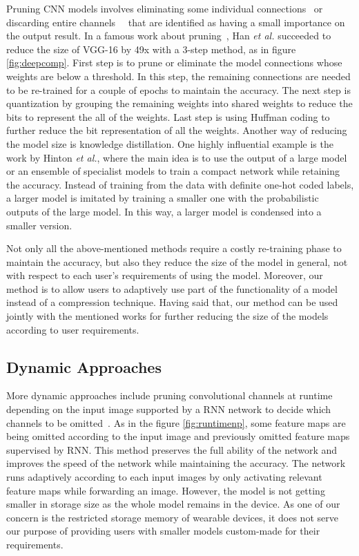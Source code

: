 Pruning CNN models involves eliminating some individual connections~\cite{molchanov2016pruning} \cite{Yu_2018_CVPR} \cite{Wang2018StructuredPP} or discarding entire channels~\cite{He_2017_ICCV}~\cite{li2016pruning} that are identified as having a small importance on the output result.
In a famous work about pruning~\cite{han2015deep}, Han \emph{et al.} succeeded to reduce the size of VGG-16 by 49x with a 3-step method, as in figure \ref{fig:deepcomp}. 
First step is to prune or eliminate the model connections whose weights are below a threshold. 
In this step, the remaining connections are needed to be re-trained for a couple of epochs to maintain the accuracy.
The next step is quantization by grouping the remaining weights into shared weights to reduce the bits to represent the all of the weights.
Last step is using Huffman coding to further reduce the bit representation of all the weights. 
Another way of reducing the model size is knowledge distillation. 
One highly influential example is the work by Hinton \emph{et al.}, where the main idea is to use the output of a large model or an ensemble of specialist models to train a compact network while retaining the accuracy.
Instead of training from the data with definite one-hot coded labels, a larger model is imitated by training a smaller one with the probabilistic outputs of the large model.
In this way, a larger model is condensed into a smaller version.

Not only all the above-mentioned methods require a costly re-training phase to maintain the accuracy,
but also they reduce the size of the model in general, not with respect to each user's requirements of using the model. 
Moreover, our method is to allow users to adaptively use part of the functionality of a model instead of a compression technique.
Having said that, our method can be used jointly with the mentioned works for further reducing the size of the models according to user requirements.

\subsection{Dynamic Approaches}

More dynamic approaches include pruning convolutional channels at runtime depending on the input image supported by a RNN network to decide which channels to be omitted~\cite{Lin2017RuntimeNP}. 
As in the figure \ref{fig:runtimenp}, some feature maps are being omitted according to the input image and previously omitted feature maps supervised by RNN.
This method preserves the full ability of the network and improves the speed of the network while maintaining the accuracy. 
The network runs adaptively according to each input images by only activating relevant feature maps while forwarding an image.
However, the model is not getting smaller in storage size as the whole model remains in the device. 
As one of our concern is the restricted storage memory of wearable devices, it does not serve our purpose of providing users with smaller models custom-made for their requirements. 

